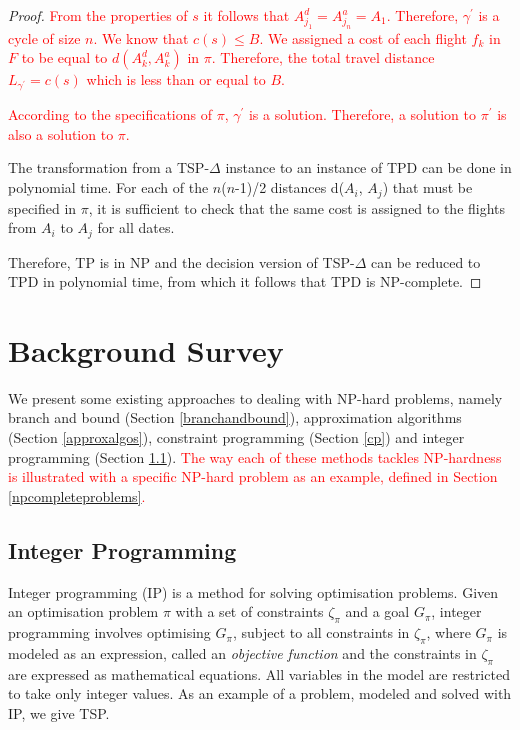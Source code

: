 \documentclass{mprop}
\theoremstyle{definition}
\begin{document}
\begin{proof}
\textcolor{red}{
From the properties of $s$ it follows that $A^{d}_{j_{1}} = A^{a}_{j_{n}} = A_{1}$. Therefore, $\gamma^{\prime}$ is a cycle of size $n$. We know that $c(s) \leq B$. We assigned a cost of each flight $f_{k}$ in $F$ to be equal to $d(A^{d}_{k}, A^{a}_{k})$ in $\pi$. Therefore, the total travel distance $L_{\gamma^{\prime}} = c(s)$ which is less than or equal to $B$.}

\textcolor{red}{
According to the specifications of $\pi$, $\gamma^{\prime}$ is a solution. Therefore, a solution to $\pi^{\prime}$ is also a solution to $\pi$.}

The transformation from a TSP-$\Delta$ instance to an instance of TPD can be done in polynomial time. For each of the $n$($n$-1)/2 distances d($A_{i}$, $A_{j}$) that must be specified in $\pi$, it is sufficient to check that the same cost is assigned to the flights from $A_{i}$ to $A_{j}$ for all dates.

Therefore, TP is in NP and the decision version of TSP-$\Delta$ can be reduced to TPD in polynomial time, from which it follows that TPD is NP-complete.

\end{proof}

\section{Background Survey}


\label{sec:existingwork}
We present some existing approaches to dealing with NP-hard problems, namely branch and bound (Section \ref{branchandbound}), approximation algorithms (Section \ref{approxalgos}), constraint programming (Section \ref{cp}) and integer programming (Section \ref{ip}). \textcolor{red}{The way each of these methods tackles NP-hardness is illustrated with a specific NP-hard problem as an example, defined in Section \ref{npcompleteproblems}.}


\subsection{Integer Programming}
\label{ip}
Integer programming (IP) is a method for solving optimisation problems. Given an optimisation problem $\pi$ with a set of constraints $\zeta_{\pi}$ and a goal $G_{\pi}$, integer programming involves optimising $G_{\pi}$, subject to all constraints in $\zeta_{\pi}$, where $G_{\pi}$ is modeled as an expression, called an \textit{objective function} and the constraints in $\zeta_{\pi}$ are expressed as mathematical equations. All variables in the model are restricted to take only integer values. As an example of a problem, modeled and solved with IP, we give TSP.
\end{document}
